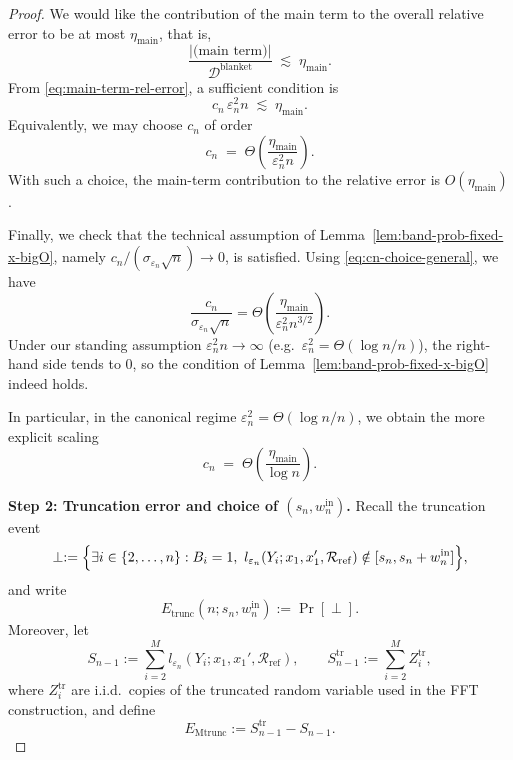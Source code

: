 \documentclass{article}
\theoremstyle{plain}
\theoremstyle{definition}
\begin{document}
\begin{proof}
We would like the contribution of the main term to the overall relative
error to be at most $\eta_{\mathrm{main}}$, that is,
\[
  \frac{\bigl|\text{(main term)}\bigr|}{\mathcal{D}^{\mathrm{blanket}}}
  \;\lesssim\;
  \eta_{\mathrm{main}}.
\]
From \eqref{eq:main-term-rel-error}, a sufficient condition is
\begin{equation}
  \label{eq:cn-condition}
  c_n \,\varepsilon_n^2 n
  \;\lesssim\;
  \eta_{\mathrm{main}}.
\end{equation}
Equivalently, we may choose $c_n$ of order
\begin{equation}
  \label{eq:cn-choice-general}
  c_n
  \;=\;
  \Theta\!\left(
    \frac{\eta_{\mathrm{main}}}{\varepsilon_n^2 n}
  \right).
\end{equation}
With such a choice, the main-term contribution to the relative error is
$O(\eta_{\mathrm{main}})$.

Finally, we check that the technical assumption of
Lemma~\ref{lem:band-prob-fixed-x-bigO},
namely $c_n / (\sigma_{\varepsilon_n}\sqrt{n}) \to 0$, is satisfied.
Using \eqref{eq:cn-choice-general}, we have
\[
  \frac{c_n}{\sigma_{\varepsilon_n}\sqrt{n}}
  =
  \Theta\!\left(
    \frac{\eta_{\mathrm{main}}}{\varepsilon_n^2 n^{3/2}}
  \right).
\]
Under our standing assumption $\varepsilon_n^2 n \to \infty$
(e.g.\ $\varepsilon_n^2 = \Theta(\log n / n)$), the right-hand side tends
to $0$, so the condition of
Lemma~\ref{lem:band-prob-fixed-x-bigO} indeed holds.

In particular, in the canonical regime
$\varepsilon_n^2 = \Theta(\log n/n)$, we obtain the more explicit scaling
\[
  c_n
  \;=\;
  \Theta\!\left(
    \frac{\eta_{\mathrm{main}}}{\log n}
  \right).
\]


\medskip

\noindent

\textbf{Step 2: Truncation error and choice of $(s_n,w_n^{\mathrm{in}})$.}
Recall the truncation event
\[
  \perp
  :=
  \Bigl\{
    \exists i\in\{2,\dots,n\} :
    B_i = 1,\ 
    l_{\varepsilon_n}(Y_i;x_1,x_1',\mathcal R_{\mathrm{ref}})
      \notin [s_n,s_n+w_n^{\mathrm{in}}]
  \Bigr\},
\]
and write
\[
  E_{\mathrm{trunc}}(n;s_n,w_n^{\mathrm{in}})
  :=
  \Pr[\perp].
\]
Moreover, let
\[
  S_{n-1}
  :=
  \sum_{i=2}^M l_{\varepsilon_n}(Y_i;x_1,x_1',\mathcal R_{\mathrm{ref}}),
  \qquad
  S_{n-1}^{\mathrm{tr}}
  :=
  \sum_{i=2}^M Z_i^{\mathrm{tr}},
\]
where $Z_i^{\mathrm{tr}}$ are i.i.d.\ copies of the truncated random
variable used in the FFT construction, and define
\[
  E_{\mathrm{Mtrunc}}
  :=
  S_{n-1}^{\mathrm{tr}} - S_{n-1}.
\]


\end{proof}
\end{document}
